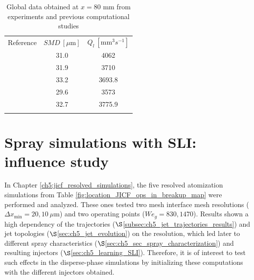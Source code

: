 \begin{table}[!h]
\centering
\caption{Global data obtained at $x = 80$ mm from experiments and previous computational studies }
\begin{tabular}{ccc}
\thickhline
Reference & $SMD~\left[ \mu \mathrm{m}\right]$  & $Q_l~\left[ \mathrm{mm}^3 s^{-1} \right]$ \\
\thickhline
{} & 31.0 &   4062  \\  
 & 31.9  & 3710  \\
 & 33.2 &  3693.8  \\
 & 29.6  & 3573  \\
 & 32.7  & 3775.9  \\
\thickhline
\end{tabular}
\label{tab:previous_numerical_studies_on_jicf_dlr_values}
\end{table}




\clearpage



\section{Spray simulations with SLI: influence study}

In Chapter \ref{ch5:jicf_resolved_simulations}, the five resolved atomization simulations from Table \ref{fig:location_JICF_ops_in_breakup_map} were performed and analyzed. These ones tested two mesh interface mesh resolutions ($\Delta x_\mathrm{min} = 20, 10~\mu$m) and two operating points ($We_g = 830, 1470$). Results shown a high dependency of the trajectories ($\S$\ref{subsec:ch5_jet_trajectories_results}) and jet topologies ($\S$\ref{sec:ch5_jet_evolution}) on the resolution, which led later to different spray characteristics ($\S$\ref{sec:ch5_sec_spray_characterization}) and resulting injectors ($\S$\ref{sec:ch5_learning_SLI}). Therefore, it is of interest to test such effects in the disperse-phase simulations by initializing these computations with the different injectors obtained.

